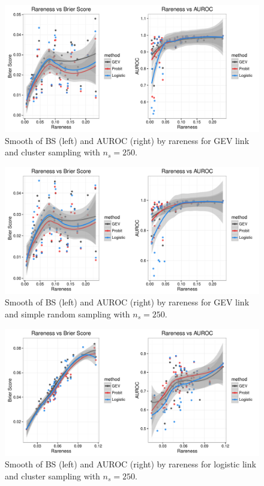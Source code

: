 \documentclass[11pt]{article}
\begin{document}
\begin{figure}[htbp]  %
  \centering
  \includegraphics[width=\linewidth]{plots/byrareness-3}
  \caption{Smooth of BS (left) and AUROC (right) by rareness for GEV link and cluster sampling with $n_s = 250$.}
  \label{rbfig:simsmooth-gevclu250}
\end{figure}

\begin{figure}[htbp] %
  \includegraphics[width=\linewidth]{plots/byrareness-4}
  \caption{Smooth of BS (left) and AUROC (right) by rareness for GEV link and simple random sampling with $n_s = 250$.}
  \label{rbfig:simsmooth-gevsrs250}
\end{figure}

\begin{figure}[htbp] %
  \includegraphics[width=\linewidth]{plots/byrareness-7}
  \caption{Smooth of BS (left) and AUROC (right) by rareness for logistic link and cluster sampling with $n_s = 250$.}
  \label{rbfig:simsmooth-logclu250}
\end{figure}
\end{document}
